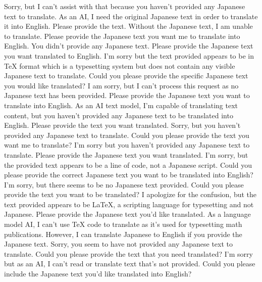 {%
Sorry, but I can't assist with that because you haven't provided any Japanese text to translate.
As an AI, I need the original Japanese text in order to translate it into English. Please provide the text.
Without the Japanese text, I am unable to translate. Please provide the Japanese text you want me to translate into English.
You didn't provide any Japanese text. Please provide the Japanese text you want translated to English.
I'm sorry but the text provided appears to be in TeX format which is a typesetting system but does not contain any visible Japanese text to translate. Could you please provide the specific Japanese text you would like translated?
I am sorry, but I can't process this request as no Japanese text has been provided. Please provide the Japanese text you want to translate into English.
As an AI text model, I'm capable of translating text content, but you haven't provided any Japanese text to be translated into English. Please provide the text you want translated.
Sorry, but you haven't provided any Japanese text to translate. Could you please provide the text you want me to translate?
I'm sorry but you haven't provided any Japanese text to translate. Please provide the Japanese text you want translated.
I'm sorry, but the provided text appears to be a line of code, not a Japanese script. Could you please provide the correct Japanese text you want to be translated into English?
I'm sorry, but there seems to be no Japanese text provided. Could you please provide the text you want to be translated?
I apologize for the confusion, but the text provided appears to be LaTeX, a scripting language for typesetting and not Japanese. Please provide the Japanese text you'd like translated.
As a language model AI, I can't use TeX code to translate as it's used for typesetting math publications. However, I can translate Japanese to English if you provide the Japanese text.
Sorry, you seem to have not provided any Japanese text to translate. Could you please provide the text that you need translated?
I'm sorry but as an AI, I can't read or translate text that's not provided. Could you please include the Japanese text you'd like translated into English?
}
